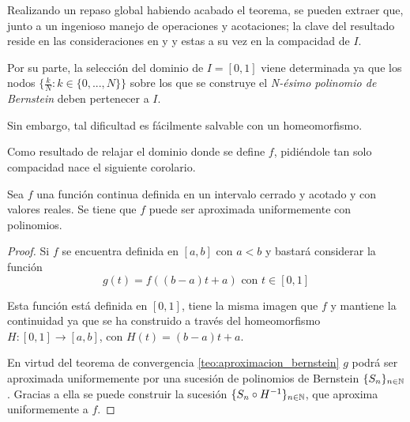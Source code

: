 %

Realizando un repaso global habiendo acabado el teorema,
 se pueden extraer que, junto a un ingenioso 
 manejo de operaciones y acotaciones; la clave del resultado reside  en las consideraciones
en  y  y estas a su vez en la 
compacidad de $I$.

Por su parte, la selección del dominio de $I = [0,1]$ viene determinada ya que 
 los nodos $\{ \frac{k}{N} \colon k\in \{0,..., N\}\}$ sobre los que se construye el \textit{N-ésimo polinomio de Bernstein}  deben pertenecer a $I$.

Sin embargo, tal dificultad es fácilmente salvable con un homeomorfismo. 


Como resultado de relajar el dominio donde se define $f$, pidiéndole tan solo
compacidad nace el siguiente corolario.  

\begin{corolario} \label{teo:Teorema-Weierstrass}
    Sea $f$ una función continua definida en un intervalo cerrado y acotado y con valores reales. Se tiene que $f$ puede ser aproximada uniformemente con polinomios. 
\end{corolario}  

\begin{proof}
    Si $f$ se encuentra definida en $[a,b]$ con $a<b$ y bastará considerar la función
    \begin{equation*}
        g(t) = f( (b-a)t + a) \text{ con } t \in [0,1]
    \end{equation*}

    Esta función está definida en $[0,1]$, tiene la misma imagen que $f$ y 
    mantiene la continuidad ya que se ha construido a través del homeomorfismo 
    $H:[0,1] \longrightarrow [a,b]$, con $H(t) = (b-a)t + a$. 

    En virtud del teorema de convergencia \ref{teo:aproximacion_bernstein}
    $g$ podrá ser aproximada uniformemente por una sucesión de polinomios de Bernstein $\{S_n\}_{n \in \mathbb{N}}$. Gracias a ella se puede
    construir la sucesión $\{S_n \circ H^{-1}\}_{n \in \mathbb{N}}$, que aproxima uniformemente a $f$. 
\end{proof}